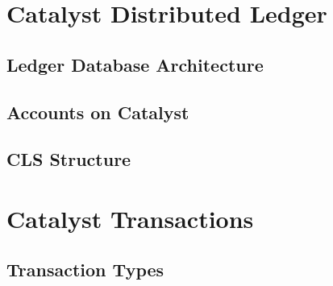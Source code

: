 \documentclass[a4paper, 12pt]{book}
\begin{document}

\chapter{Catalyst Distributed Ledger} \label{Cha:LDA}


\section{Ledger Database Architecture} \label{Sec:LDA}



\section{Accounts on Catalyst} \label{Sec:AoC}



\section{CLS Structure}\label{SecLCS}




%


\chapter{Catalyst Transactions} \label{Cha:Tra}




\section{Transaction Types} \label{Sec:Typ}


\end{document}
